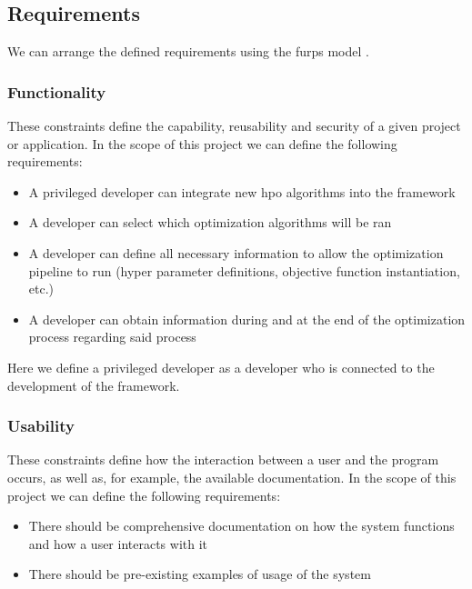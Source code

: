 
\subsection{Requirements}


We can arrange the defined requirements using the \acrfull{furps} model \parencite{furps}.

\subsubsection{Functionality}

These constraints define the capability, reusability and security of a given project or application. In the scope of this project we can define the following requirements:

\begin{itemize}
	\item A privileged developer can integrate new \acrshort{hpo} algorithms into the framework
	\item A developer can select which optimization algorithms will be ran
	\item A developer can define all necessary information to allow the optimization pipeline to run (hyper parameter definitions, objective function instantiation, etc.)
	\item A developer can obtain information during and at the end of the optimization process regarding said process
\end{itemize}

Here we define a privileged developer as a developer who is connected to the development of the framework.

\subsubsection{Usability}

These constraints define how the interaction between a user and the program occurs, as well as, for example, the available documentation. In the scope of this project we can define the following requirements:

\begin{itemize}
	\item There should be comprehensive documentation on how the system functions and how a user interacts with it
	\item There should be pre-existing examples of usage of the system
\end{itemize}

